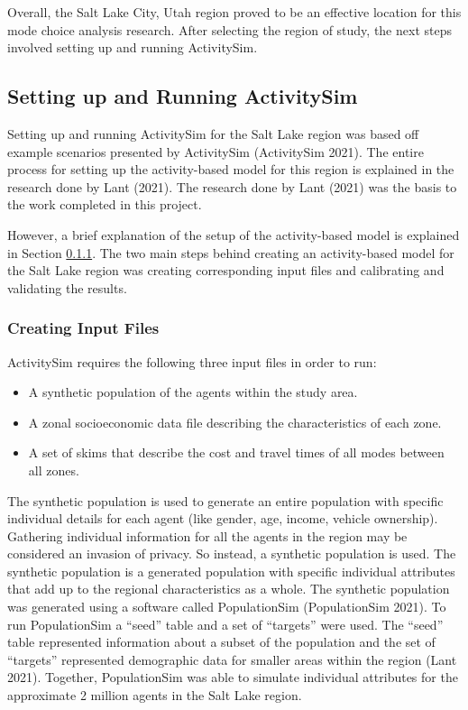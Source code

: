 \documentclass[12pt, oneside, openright]{byuthesis}
\providecommand{\tightlist}{%
  \setlength{\itemsep}{0pt}\setlength{\parskip}{0pt}}
\begin{document}
Overall, the Salt Lake City, Utah region proved to be an effective location for this mode choice analysis research. After selecting the region of study, the next steps involved setting up and running ActivitySim.

\hypertarget{setting-up-and-running-activitysim}{%
\subsection{Setting up and Running ActivitySim}\label{setting-up-and-running-activitysim}}

Setting up and running ActivitySim for the Salt Lake region was based off example scenarios presented by ActivitySim (ActivitySim 2021). The entire process for setting up the activity-based model for this region is explained in the research done by Lant (2021). The research done by Lant (2021) was the basis to the work completed in this project.

However, a brief explanation of the setup of the activity-based model is explained in Section \ref{asiminput}. The two main steps behind creating an activity-based model for the Salt Lake region was creating corresponding input files and calibrating and validating the results.

\hypertarget{asiminput}{%
\subsubsection{Creating Input Files}\label{asiminput}}

ActivitySim requires the following three input files in order to run:

\begin{itemize}
\tightlist
\item
  A synthetic population of the agents within the study area.
\item
  A zonal socioeconomic data file describing the characteristics of each zone.
\item
  A set of skims that describe the cost and travel times of all modes between all zones.
\end{itemize}

The synthetic population is used to generate an entire population with specific individual details for each agent (like gender, age, income, vehicle ownership). Gathering individual information for all the agents in the region may be considered an invasion of privacy. So instead, a synthetic population is used. The synthetic population is a generated population with specific individual attributes that add up to the regional characteristics as a whole. The synthetic population was generated using a software called PopulationSim (PopulationSim 2021). To run PopulationSim a ``seed'' table and a set of ``targets'' were used. The ``seed'' table represented information about a subset of the population and the set of ``targets'' represented demographic data for smaller areas within the region (Lant 2021). Together, PopulationSim was able to simulate individual attributes for the approximate 2 million agents in the Salt Lake region.
\end{document}

